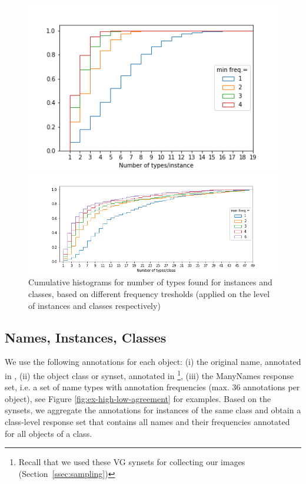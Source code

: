 \begin{figure}
\begin{minipage}[b]{0.4\linewidth}
\includegraphics[scale=.4]{figures/types_instances.png}
\end{minipage}
\begin{minipage}[b]{0.6\linewidth}
\includegraphics[scale=.4]{figures/types_classes.png}
\end{minipage}
 \caption{\label{fig:ntypes} Cumulative histograms for number of types found for instances and classes, based on different frequency tresholds (applied on the level of instances and classes respectively)}
\end{figure}

\subsection{Names, Instances, Classes}
\label{subsec:counts}

We use the following annotations for each object: (i) the original name, annotated in \vg, (ii) the object class or synset, annotated in \vg\footnote{Recall that we used these VG synsets for collecting our images (Section~\ref{ssec:sampling})},
 (iii) the ManyNames response set, i.e. a set of name types with annotation frequencies (max. 36 annotations per object),  see Figure \ref{fig:ex-high-low-agreement} for examples.
 Based on the \vg synsets, we aggregate the annotations for instances of the same class and obtain a class-level response set that contains all names and their frequencies annotated for all objects of a class. 
 
